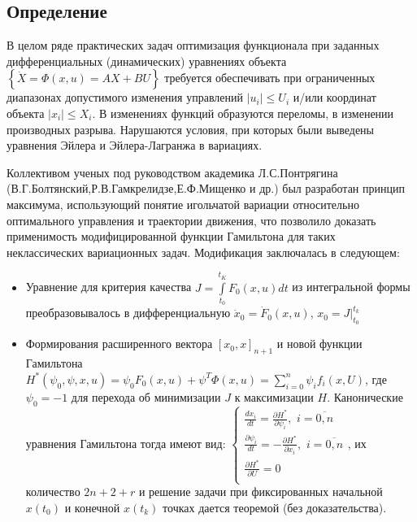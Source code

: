\documentclass[preprint,russian,a5paper,10pt,twoside,mediummath]{ncc}
\begin{document}
	\subsection{Определение\label{maximum:def}}
\par В целом ряде практических задач оптимизация функционала при заданных дифференциальных (динамических) уравнениях объекта $\left\{ \dot{X}=\Phi \left( x,u \right)=AX+BU \right\}$ требуется обеспечивать при ограниченных диапазонах допустимого изменения управлений $\left| {{u}_{i}} \right|\le {{U}_{i}}$   и/или координат объекта $\left| {{x}_{i}} \right|\le {{X}_{i}}$. В изменениях функций образуются переломы, в изменении производных разрыва. Нарушаются условия, при которых были выведены уравнения Эйлера и Эйлера-Лагранжа в вариациях.
\par Коллективом ученых под руководством академика Л.С.Понтрягина (В.Г.Болтянский,Р.В.Гамкрелидзе,Е.Ф.Мищенко и др.) был разработан принцип максимума, использующий понятие игольчатой вариации относительно оптимального управления и траектории движения, что позволило доказать применимость модифицированной функции Гамильтона для таких неклассических вариационных задач. Модификация заключалась в следующем:
\begin{itemize}
\item Уравнение для критерия качества $J=\int\limits_{{{t}_{0}}}^{{{t}_{K}}}{{{F}_{0}}\left( x,u \right)dt}$ из интегральной формы преобразовывалось в дифференциальную ${{\dot{x}}_{0}}={{\dot{F}}_{0}}\left( x,u \right)$, ${{x}_{0}}=\left. J \right|_{{{t}_{0}}}^{{{t}_{k}}}$
\item Формирования расширенного вектора ${{\left[ {{x}_{0}},x \right]}_{n+1}}$ и новой функции Гамильтона ${{H}^{*}}\left( {{\psi }_{0}},\psi ,x,u \right)={{\psi }_{0}}{{F}_{0}}\left( x,u \right)+{{\psi }^{T}}\Phi \left( x,u \right)=\sum\limits_{i=0}^{n}{{{\psi }_{i}}{{f}_{i}}\left( x,U \right)}$, где ${{\psi }_{0}}=-1$ для перехода об минимизации $J$ к максимизации $H$.
Канонические уравнения Гамильтона тогда имеют вид:
$\left\{ \begin{array}{*{35}{l}}
   \frac{d{{x}_{i}}}{dt}=\frac{\partial {{H}^{*}}}{\partial {{\psi }_{i}}},\,\,i=\overline{0,n}  \\
   \frac{\partial {{\psi }_{i}}}{dt}=-\frac{\partial {{H}^{*}}}{\partial {{x}_{i}}},\,\,i=\overline{0,n}  \\
   \frac{\partial {{H}^{*}}}{\partial U}=0  \\
\end{array} \right.$, их количество $2n+2+r$ и решение задачи при фиксированных начальной $x\left( {{t}_{0}} \right)$ и конечной $x\left( {{t}_{k}} \right)$ точках дается теоремой (без доказательства).
\end{itemize}
\end{document}
